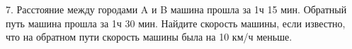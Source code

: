 7. Расстояние между городами A и B машина прошла за 1ч 15 мин. Обратный путь машина прошла за 1ч 30 мин. Найдите скорость машины, если известно, что на обратном пути скорость машины была на 10 км/ч меньше.\\
